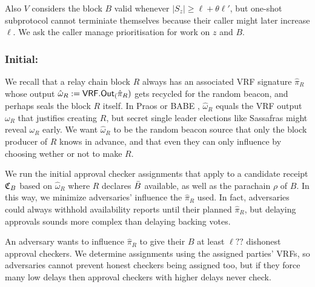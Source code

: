 Also $V$ considers the block $B$ valid whenever $|S_z| \ge \ell + \theta \ell'$, but one-shot subprotocol cannot terminiate themselves because their caller might later increase $\ell$.  We ask the caller manage prioritisation for work on $z$ and $B$.

%

\subsubsection{Initial:}


We recall that a relay chain block $R$ always has an associated VRF signature $\hat{\pi}_R$ whose output $\hat{\omega}_R := \mathsf{VRF}.\mathsf{Out}_(\hat{\pi}_R)$ gets recycled for the random beacon, and perhaps seals the block $R$ itself.  In Praos \cite{Praos} or BABE \cite{BABE}, $\hat{\omega}_R$ equals the VRF output $\omega_R$ that justifies creating $R$, but secret single leader elections like Sassafras \cite{Sassafras} might reveal $\omega_R$ early.  We want $\hat{\omega}_R$ to be the random beacon source that only the block producer of $R$ knows in advance, and that even they can only influence by choosing wether or not to make $R$.

We run the initial approval checker assignments that apply to a candidate receipt $\mathfrak{C}_B$ based on $\hat{\omega}_R$ where $R$ declares $\bar{B}$ available, as well as the parachain $\rho$ of $B$.  In this way, we minimize adversaries' influence the $\hat{\pi}_R$ used.  In fact, adversaries could always withhold availability reports until their planned $\hat{\pi}_R$, but delaying approvals sounds more complex than delaying backing votes.

An adversary wants to influence $\hat{\pi}_R$ to give their $B$ at least $\ell??$ dishonest approval checkers.  We determine assignments using the assigned parties' VRFs, so adversaries cannot prevent honest checkers being assigned too, but if they force many low delays then approval checkers with higher delays never check.


